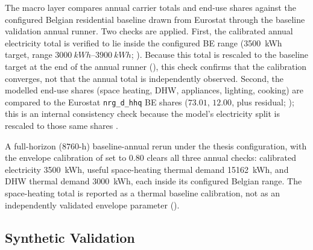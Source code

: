The macro layer compares annual carrier totals and end-use shares against the configured Belgian residential baseline drawn from Eurostat \cite{EnergyConsumptionHouseholds} through the baseline validation annual runner. Two checks are applied. First, the calibrated annual electricity total is verified
to lie inside the configured BE range (\SI{3500}{kWh} target, range $\SIrange{3000}{3900}{kWh}$; ). Because this total is rescaled to the baseline target at the end of the annual runner (), this check confirms that the calibration converges, not that the annual total is independently observed. Second, the modelled end-use shares (space heating, DHW, appliances, lighting, cooking) are compared to the Eurostat \texttt{nrg\_d\_hhq} BE shares ($73.01$, $12.00$, plus residual; ); this is an internal consistency check because the model's electricity split is rescaled to those same shares \cite{EnergyConsumptionHouseholds}.


A full-horizon ($8760$-h) baseline-annual rerun under the thesis configuration, with the envelope calibration of  set to $0.80$ clears all three annual checks: calibrated electricity \SI{3500}{kWh}, useful space-heating thermal demand \SI{15162}{kWh}, and DHW thermal demand \SI{3000}{kWh}, each inside its configured Belgian range. The space-heating total is reported as a thermal baseline calibration, not as an independently validated envelope parameter ().


\subsection{Synthetic Validation}
\label{sec:syntheticValidation}

